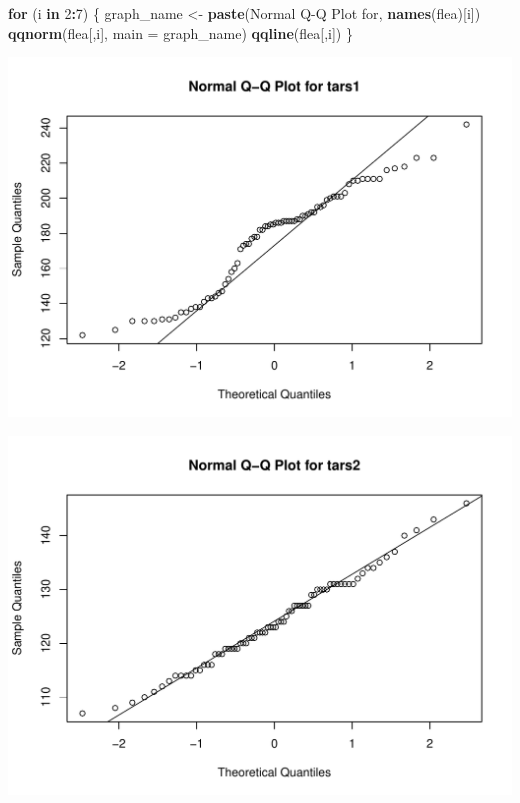 \documentclass[
]{article}
\newenvironment{Shaded}{\begin{snugshade}}{\end{snugshade}}
\newcommand{\AttributeTok}[1]{\textcolor[rgb]{0.13,0.29,0.53}{#1}}
\newcommand{\ControlFlowTok}[1]{\textcolor[rgb]{0.13,0.29,0.53}{\textbf{#1}}}
\newcommand{\DecValTok}[1]{\textcolor[rgb]{0.00,0.00,0.81}{#1}}
\newcommand{\FunctionTok}[1]{\textcolor[rgb]{0.13,0.29,0.53}{\textbf{#1}}}
\newcommand{\NormalTok}[1]{#1}
\newcommand{\OtherTok}[1]{\textcolor[rgb]{0.56,0.35,0.01}{#1}}
\newcommand{\SpecialCharTok}[1]{\textcolor[rgb]{0.81,0.36,0.00}{\textbf{#1}}}
\newcommand{\StringTok}[1]{\textcolor[rgb]{0.31,0.60,0.02}{#1}}
\begin{document}
\begin{Shaded}
\begin{Highlighting}[]
\ControlFlowTok{for}\NormalTok{ (i }\ControlFlowTok{in} \DecValTok{2}\SpecialCharTok{:}\DecValTok{7}\NormalTok{) \{}
\NormalTok{  graph\_name }\OtherTok{\textless{}{-}} \FunctionTok{paste}\NormalTok{(}\StringTok{\textquotesingle{}Normal Q{-}Q Plot for\textquotesingle{}}\NormalTok{, }\FunctionTok{names}\NormalTok{(flea)[i])  }
  \FunctionTok{qqnorm}\NormalTok{(flea[,i], }\AttributeTok{main =}\NormalTok{ graph\_name)}
  \FunctionTok{qqline}\NormalTok{(flea[,i])}
\NormalTok{\}}
\end{Highlighting}
\end{Shaded}

\begin{center}\includegraphics[width=0.8\linewidth]{multivariate_lab_hw2_files/figure-latex/unnamed-chunk-2-1} \end{center}

\begin{center}\includegraphics[width=0.8\linewidth]{multivariate_lab_hw2_files/figure-latex/unnamed-chunk-2-2} \end{center}
\end{document}
